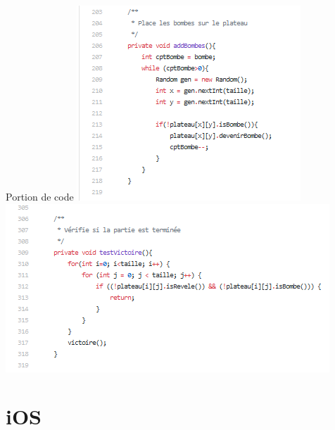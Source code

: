 \documentclass{beamer}
\begin{document}
\begin{frame}
\begin{block}{Portion de code}
	\includegraphics[scale=0.65]{Images/BombeRandom.png}
	\includegraphics[scale=0.65]{Images/Victoire.png}
\end{block}
   
\end{frame}



\section{iOS}
\end{document}
